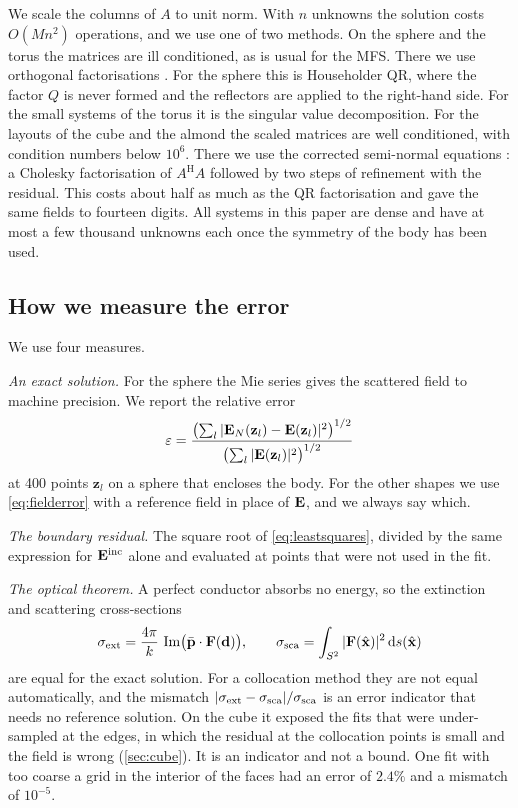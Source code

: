 We scale the columns of $A$ to unit norm. With $n$ unknowns the solution costs $O(Mn^2)$ operations, and we use one of two methods. On the sphere and the torus the matrices are ill conditioned, as is usual for the MFS. There we use orthogonal factorisations \cite{golub2013}. For the sphere this is Householder QR, where the factor $Q$ is never formed and the reflectors are applied to the right-hand side. For the small systems of the torus it is the singular value decomposition. For the layouts of the cube and the almond the scaled matrices are well conditioned, with condition numbers below $10^{6}$. There we use the corrected semi-normal equations \cite{bjorck1987}: a Cholesky factorisation of $A^{\mathrm{H}}A$ followed by two steps of refinement with the residual. This costs about half as much as the QR factorisation and gave the same fields to fourteen digits. All systems in this paper are dense and have at most a few thousand unknowns each once the symmetry of the body has been used.

\subsection{How we measure the error}
\label{sec:errors}

We use four measures.

\emph{An exact solution.} For the sphere the Mie series \cite{mie1908,bohren1998} gives the scattered field to machine precision. We report the relative error
\begin{equation}
  \varepsilon = \frac{\bigl(\sum_{l}|\mathbf{E}_N(\mathbf{z}_l)-\mathbf{E}(\mathbf{z}_l)|^2\bigr)^{1/2}}{\bigl(\sum_{l}|\mathbf{E}(\mathbf{z}_l)|^2\bigr)^{1/2}}
  \label{eq:fielderror}
\end{equation}
at 400 points $\mathbf{z}_l$ on a sphere that encloses the body. For the other shapes we use \eqref{eq:fielderror} with a reference field in place of $\mathbf{E}$, and we always say which.

\emph{The boundary residual.} The square root of \eqref{eq:leastsquares}, divided by the same expression for $\mathbf{E}^{\mathrm{inc}}$ alone and evaluated at points that were not used in the fit.

\emph{The optical theorem.} A perfect conductor absorbs no energy, so the extinction and scattering cross-sections
\begin{equation}
  \sigma_{\mathrm{ext}} = \frac{4\pi}{k}\,\operatorname{Im}\bigl(\bar{\mathbf{p}}\cdot\mathbf{F}(\mathbf{d})\bigr), \qquad
  \sigma_{\mathrm{sca}} = \int_{S^2}|\mathbf{F}(\hat{\mathbf{x}})|^2\,\mathrm{d}s(\hat{\mathbf{x}})
  \label{eq:optical}
\end{equation}
are equal for the exact solution. For a collocation method they are not equal automatically, and the mismatch $|\sigma_{\mathrm{ext}}-\sigma_{\mathrm{sca}}|/\sigma_{\mathrm{sca}}$ is an error indicator that needs no reference solution. On the cube it exposed the fits that were under-sampled at the edges, in which the residual at the collocation points is small and the field is wrong (\autoref{sec:cube}). It is an indicator and not a bound. One fit with too coarse a grid in the interior of the faces had an error of $2.4\%$ and a mismatch of $10^{-5}$.

